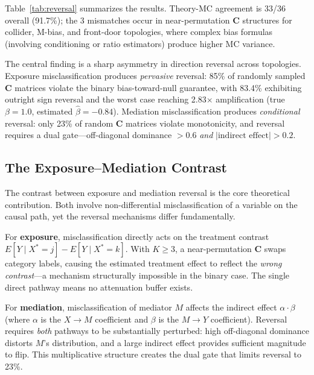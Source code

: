 \documentclass[11pt,letterpaper]{article}
\begin{document}
Table~\ref{tab:reversal} summarizes the results.
Theory-MC agreement is 33/36 overall (91.7\%); the 3 mismatches occur in near-permutation $\mathbf{C}$ structures for collider, M-bias, and front-door topologies, where complex bias formulas (involving conditioning or ratio estimators) produce higher MC variance.

The central finding is a sharp asymmetry in direction reversal across topologies.
Exposure misclassification produces \emph{pervasive} reversal: 85\% of randomly sampled $\mathbf{C}$ matrices violate the binary bias-toward-null guarantee, with 83.4\% exhibiting outright sign reversal and the worst case reaching 2.83$\times$ amplification (true $\beta = 1.0$, estimated $\hat{\beta} = -0.84$).
Mediation misclassification produces \emph{conditional} reversal: only 23\% of random $\mathbf{C}$ matrices violate monotonicity, and reversal requires a dual gate---off-diagonal dominance $> 0.6$ \emph{and} $|\text{indirect effect}| > 0.2$.

\subsection{The Exposure--Mediation Contrast}

The contrast between exposure and mediation reversal is the core theoretical contribution.
Both involve non-differential misclassification of a variable on the causal path, yet the reversal mechanisms differ fundamentally.

For \textbf{exposure}, misclassification directly acts on the treatment contrast $E[Y \mid X^* = j] - E[Y \mid X^* = k]$.
With $K \geq 3$, a near-permutation $\mathbf{C}$ swaps category labels, causing the estimated treatment effect to reflect the \emph{wrong contrast}---a mechanism structurally impossible in the binary case.
The single direct pathway means no attenuation buffer exists.

For \textbf{mediation}, misclassification of mediator $M$ affects the indirect effect $\alpha \cdot \beta$ (where $\alpha$ is the $X \to M$ coefficient and $\beta$ is the $M \to Y$ coefficient).
Reversal requires \emph{both} pathways to be substantially perturbed: high off-diagonal dominance distorts $M$'s distribution, and a large indirect effect provides sufficient magnitude to flip.
This multiplicative structure creates the dual gate that limits reversal to 23\%.
\end{document}
